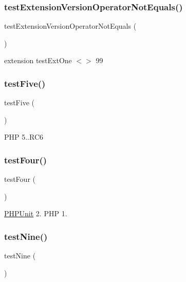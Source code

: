 \subsubsection{\texorpdfstring{test\+Extension\+Version\+Operator\+Not\+Equals()}{testExtensionVersionOperatorNotEquals()}}
{\footnotesize\ttfamily test\+Extension\+Version\+Operator\+Not\+Equals (\begin{DoxyParamCaption}{ }\end{DoxyParamCaption})}

extension test\+Ext\+One $<$$>$ 99 \mbox{\label{class_requirements_test_a0756440631c4db21ab3607063465834a}} 
\subsubsection{\texorpdfstring{test\+Five()}{testFive()}}
{\footnotesize\ttfamily test\+Five (\begin{DoxyParamCaption}{ }\end{DoxyParamCaption})}

P\+HP 5..\+R\+C6 \mbox{\label{class_requirements_test_a610ae959d988c18c588f47517f6a291f}} 
\subsubsection{\texorpdfstring{test\+Four()}{testFour()}}
{\footnotesize\ttfamily test\+Four (\begin{DoxyParamCaption}{ }\end{DoxyParamCaption})}

\mbox{\hyperlink{namespace_p_h_p_unit}{P\+H\+P\+Unit}} 2.  P\+HP 1. \mbox{\label{class_requirements_test_a80538b5f401ca6c091eabea9fb507c00}} 
\subsubsection{\texorpdfstring{test\+Nine()}{testNine()}}
{\footnotesize\ttfamily test\+Nine (\begin{DoxyParamCaption}{ }\end{DoxyParamCaption})}


